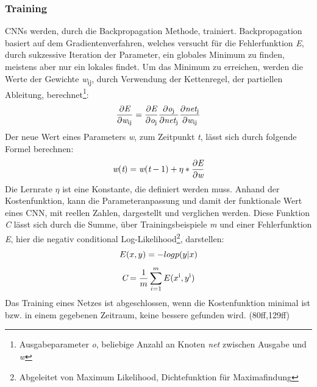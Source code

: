 \documentclass[twosided,a4,10pt]{article}
\begin{document}
\begin{multicols}{2}
		\subsubsection{Training}
		CNNs werden, durch die Backpropagation Methode, trainiert. Backpropagation basiert auf dem Gradientenverfahren, welches versucht für die Fehlerfunktion \textit{E}, durch sukzessive Iteration der Parameter, ein globales Minimum zu finden, meistens aber nur ein lokales findet. Um das Minimum zu erreichen, werden die Werte der Gewichte \textit{w}\textsubscript{ij}, durch Verwendung der Kettenregel, der partiellen Ableitung, berechnet\footnote[13]{Ausgabeparameter \textit{o}, beliebige Anzahl an Knoten \textit{net} zwischen Ausgabe und \textit{w}}:
		\begin{equation*}
		\centering
		\frac{\partial\textit{E}}{\partial\textit{w}\textsubscript{ij}} = \frac{\partial\textit{E}}{\partial\textit{o}\textsubscript{j}} \frac{\partial\textit{o}\textsubscript{j}}{\partial\textit{net}\textsubscript{j}}  \frac{\partial\textit{net}\textsubscript{j}}{\partial\textit{w}\textsubscript{ij}} 
		\end{equation*}\newline
		Der neue Wert eines Parameters \textit{w}, zum Zeitpunkt \textit{t}, lässt sich durch folgende Formel berechnen:
		\begin{equation*}
		\centering
		\textit{w}(\textit{t}) = \textit{w}(\textit{t}-1) + \eta * \frac{\partial\textit{E}}{\partial\textit{w}} 
		\end{equation*}
		Die Lernrate $\eta$ ist eine Konstante, die definiert werden muss.\newline
		Anhand der Kostenfunktion, kann die Parameteranpassung und damit der funktionale Wert eines CNN, mit reellen Zahlen, dargestellt und verglichen werden. Diese Funktion \textit{C} lässt sich durch die Summe, über Trainingsbeispiele \textit{m} und einer Fehlerfunktion \textit{E}, hier die negativ conditional Log-Likelihood\footnote[14]{Abgeleitet von Maximum Likelihood, Dichtefunktion für Maximafindung}, darstellen: 
		\begin{equation*}
			\centering
			E(x,y) = -log p(y|x)
		\end{equation*}
		\begin{equation*}
			\centering
			\textit{C} = \frac{1}{m}\sum_{i=1}^{m}E(x\textsuperscript{i},y\textsuperscript{i})
		\end{equation*}
		Das Training eines Netzes ist abgeschlossen, wenn die Kostenfunktion minimal ist bzw. in einem gegebenen Zeitraum, keine bessere gefunden wird. \cite{goodfellow}(80ff,129ff)

\end{multicols}
\end{document}
